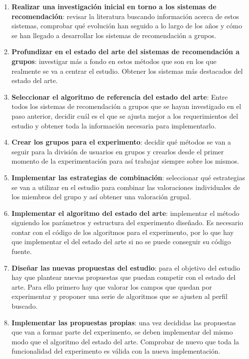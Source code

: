 \begin{enumerate}
	\item{\textbf{Realizar una investigación inicial en torno a los sistemas de recomendación}: revisar la literatura buscando información acerca de estos sistemas, comprobar qué evolución han seguido a lo largo de los años y cómo se han llegado a desarrollar los sistemas de recomendación a grupos.}
	\item{\textbf{Profundizar en el estado del arte del sistemas de recomendación a grupos}: investigar más a fondo en estos métodos que son en los que realmente se va a centrar el estudio. Obtener los sistemas más destacados del estado del arte.}
	\item{\textbf{Seleccionar el algoritmo de referencia del estado del arte}: Entre todos los sistemas de recomendación a grupos que se hayan investigado en el paso anterior, decidir cuál es el que se ajusta mejor a los requerimientos del estudio y obtener toda la información necesaria para implementarlo.}
	\item{\textbf{Crear los grupos para el experimento}: decidir qué métodos se van a seguir para la división de usuarios en grupos y crearlos desde el primer momento de la experimentación para así trabajar siempre sobre los mismos.}
	\item{\textbf{Implementar las estrategias de combinación}: seleccionar qué estrategias se van a utilizar en el estudio para combinar las valoraciones individuales de los miembros del grupo y así obtener una valoración grupal.}
	\item{\textbf{Implementar el algoritmo del estado del arte}: implementar el método siguiendo los parámetros y estructura del experimento diseñado. Es necesario contar con el código de los algoritmos para el experimento, por lo que hay que implementar el del estado del arte si no se puede conseguir su código fuente.}
	\item{\textbf{Diseñar las nuevas propuestas del estudio}: para el objetivo del estudio hay que plantear nuevas propuestas que puedan competir con el estado del arte. Para ello primero hay que valorar los campos que quedan por experimentar y proponer una serie de algoritmos que se ajusten al perfil buscado.}
	\item{\textbf{Implementar las propuestas propias}: una vez decididas las propuestas que van a formar parte del experimento, se deben implementar del mismo modo que el algoritmo del estado del arte. Comprobar de nuevo que toda la funcionalidad del experimento es válida con la nueva implementación.}

\end{enumerate}
